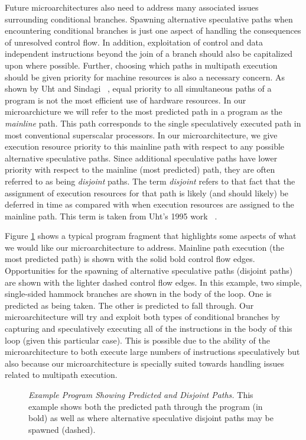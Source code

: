 \documentclass[10pt,dvips]{article}
\begin{document}
Future microarchitectures also need to 
address many associated issues surrounding conditional branches.
Spawning alternative speculative paths when encountering conditional
branches is just one aspect of handling the consequences of
unresolved control flow.
In addition, exploitation
of control
and data independent instructions beyond the join of a branch should
also be capitalized upon where possible.
Further, choosing which paths in multipath execution should
be given priority for machine resources is also a necessary concern.
As shown by Uht and Sindagi ~\cite{Uht95},
equal priority to all simultaneous paths
of a program is not the most efficient use of hardware resources.
In our microarchicture we will refer to the most predicted path
in a program as the 
\textit{mainline} path.  
This path corresponds to the single speculatively
executed path in most conventional superscalar processors.
In our microarchitecture,
we give execution resource priority to this mainline path with respect
to any possible alternative speculative paths.  
Since additional speculative paths have lower priority with
respect to the mainline (most predicted) path, they are often referred
to as being
\textit{disjoint} paths.  
The term \textit{disjoint} refers to that fact that the assignment
of execution resources for that path is likely (and should likely) be
deferred in time
as compared with when execution resources are assigned to the mainline
path.
This term is taken from Uht's 
1995 work ~\cite{Uht95}.

Figure \ref{fig:disjoint} shows a typical program fragment that
highlights some aspects of what we would like our microarchitecture
to address.
Mainline path execution (the most predicted path) is shown with the
solid bold control flow edges.  Opportunities for the spawning of alternative
speculative paths (disjoint paths) are shown with the lighter dashed
control flow edges.  In this example, two simple, single-sided hammock 
branches are shown in the body of the loop.  One is predicted as
being taken.  The other is predicted to fall through.  Our microarchitecture
will try and exploit both types of conditional branches by capturing
and speculatively executing
all of the instructions in the body of this loop (given this particular
case).  This is possible due to the ability of the microarchitecture to
both execute large numbers of instructions speculatively but also
because our microarchitecture is specially suited towards handling
issues related to multipath execution.

\begin{figure}
\centering
{}
\caption{{\em Example Program Showing Predicted and Disjoint
Paths.} 
This example shows both the predicted path through the program 
(in bold) as
well as where alternative speculative disjoint paths may be
spawned (dashed).}
\label{fig:disjoint}
\end{figure}
\end{document}
